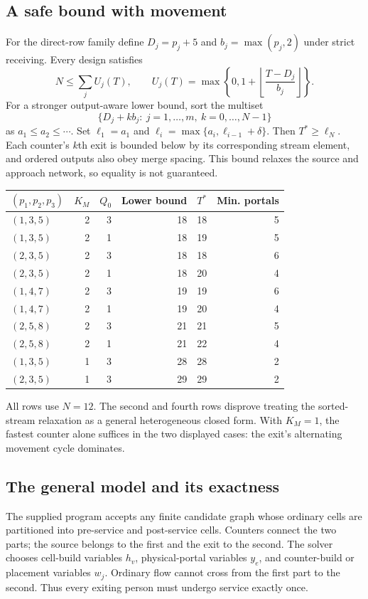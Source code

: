 \documentclass[11pt]{article}
\newcommand{\floor}[1]{\left\lfloor#1\right\rfloor}
\begin{document}
\subsection{A safe bound with movement}
For the direct-row family define $D_j=p_j+5$ and $b_j=\max(p_j,2)$ under strict receiving. Every design satisfies
\[
 N\le\sum_j U_j(T),\qquad
 U_j(T)=\max\left\{0,1+\floor{\frac{T-D_j}{b_j}}\right\}.
\]
For a stronger output-aware lower bound, sort the multiset
\[
 \{D_j+k b_j:\ j=1,\ldots,m,\ k=0,\ldots,N-1\}
\]
as $a_1\le a_2\le\cdots$. Set $\ell_1=a_1$ and
$\ell_i=\max\{a_i,\ell_{i-1}+\delta\}$. Then $T^*\ge\ell_N$. Each counter's $k$th exit is bounded below by its corresponding stream element, and ordered outputs also obey merge spacing. This bound relaxes the source and approach network, so equality is not guaranteed.

\begin{center}\small
\begin{tabular}{lrrrrr}
\toprule
$(p_1,p_2,p_3)$&$K_M$&$Q_0$&Lower bound&$T^*$&Min. portals\\\midrule
$(1,3,5)$&2&3&18&18&5\\
$(1,3,5)$&2&1&18&19&5\\
$(2,3,5)$&2&3&18&18&6\\
$(2,3,5)$&2&1&18&20&4\\
$(1,4,7)$&2&3&19&19&6\\
$(1,4,7)$&2&1&19&20&4\\
$(2,5,8)$&2&3&21&21&5\\
$(2,5,8)$&2&1&21&22&4\\
$(1,3,5)$&1&3&28&28&2\\
$(2,3,5)$&1&3&29&29&2\\
\bottomrule
\end{tabular}
\end{center}
All rows use $N=12$. The second and fourth rows disprove treating the sorted-stream relaxation as a general heterogeneous closed form. With $K_M=1$, the fastest counter alone suffices in the two displayed cases: the exit's alternating movement cycle dominates.

\subsection{The general model and its exactness}
The supplied program accepts any finite candidate graph whose ordinary cells are partitioned into pre-service and post-service cells. Counters connect the two parts; the source belongs to the first and the exit to the second. The solver chooses cell-build variables $h_v$, physical-portal variables $y_e$, and counter-build or placement variables $w_j$. Ordinary flow cannot cross from the first part to the second. Thus every exiting person must undergo service exactly once.
\end{document}
